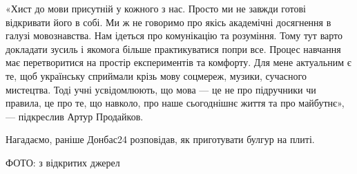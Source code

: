 «Хист до мови присутній у кожного з нас. Просто ми не завжди готові відкривати
його в собі. Ми ж не говоримо про якісь академічні досягнення в галузі
мовознавства. Нам ідеться про комунікацію та розуміння. Тому тут варто
докладати зусиль і якомога більше практикуватися попри все. Процес навчання має
перетворитися на простір експериментів та комфорту. Для мене актуальним є те,
щоб українську сприймали крізь мову соцмереж, музики, сучасного мистецтва. Тоді
учні усвідомлюють, що мова — це не про підручники чи правила, це про те, що
навколо, про наше сьогоднішнє життя та про майбутнє», — підкреслив Артур
Продайков.

Нагадаємо, раніше Донбас24 розповідав, як приготувати булгур на плиті.

ФОТО: з відкритих джерел
